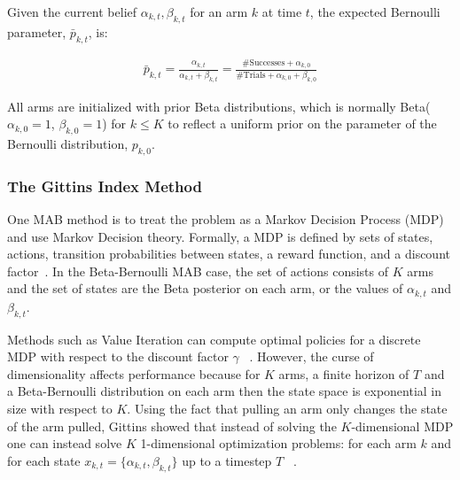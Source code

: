 \documentclass[10pt, conference]{ieeeconf}      %
\begin{document}
Given the current belief $\alpha_{k, t}, \beta_{k, t}$ for an arm $k$ at time $t$, the expected Bernoulli parameter, $\bar{p}_{k,t}$, is:

\vspace{-2ex}
\begin{align}\label{eq:shape_sampling}
\bar{p}_{k,t} = \frac{\alpha_{k,t}}{\alpha_{k,t} + \beta_{k,t}} = \frac{\mbox{\#Successes} + \alpha_{k,0}}{\mbox{\#Trials}+\alpha_{k,0}+\beta_{k,0}}
\end{align}

All arms are initialized with prior Beta distributions, which is normally Beta($\alpha_{k,0}=1$,  $\beta_{k,0} =1$) for $k\leq K$ to reflect a uniform prior on the parameter of the Bernoulli distribution, $p_{k,0}$.



\subsubsection{The Gittins Index Method} 
One MAB method is to treat the problem as a Markov Decision Process (MDP) and use Markov Decision theory.
Formally, a MDP is defined by sets of states, actions, transition probabilities between states, a reward function, and a discount factor~\cite{barto1998reinforcement}.
In the Beta-Bernoulli MAB case, the set of actions consists of $K$ arms and the set of states are the Beta posterior on each arm, or the values of $\alpha_{k,t}$ and $\beta_{k,t}$. 

Methods such as Value Iteration can compute optimal policies for a discrete MDP with respect to the discount factor $\gamma$ ~\cite{barto1998reinforcement}.
However, the curse of dimensionality affects performance because for $K$ arms, a finite horizon of $T$ and a Beta-Bernoulli distribution on each arm then the state space is exponential in size with respect to $K$.
Using the fact that pulling an arm only changes the state of the arm pulled, Gittins showed that instead of solving the $K$-dimensional MDP one can instead solve $K$ 1-dimensional optimization problems: for each arm $k$ and for each state $x_{k,t} = \lbrace \alpha_{k,t}, \beta_{k,t} \rbrace$ up to a timestep $T$ ~\cite{weber1992gittins}. 
\end{document}
